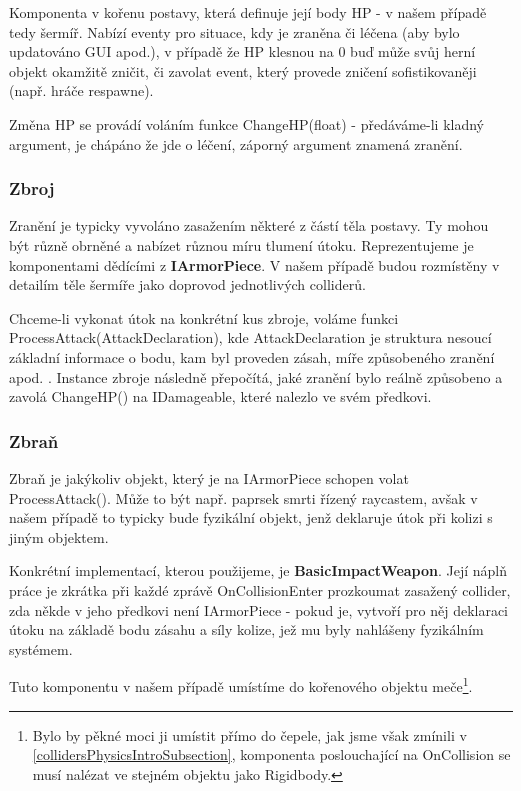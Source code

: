 Komponenta v kořenu postavy, která definuje její body HP - v našem případě tedy šermíř. Nabízí eventy pro situace, kdy je zraněna či léčena (aby bylo updatováno GUI apod.), v případě že HP klesnou na 0 buď může svůj herní objekt okamžitě zničit, či zavolat event, který provede zničení sofistikovaněji (např. hráče respawne). 

Změna HP se provádí voláním funkce ChangeHP(float) - předáváme-li kladný argument, je chápáno že jde o léčení, záporný argument znamená zranění.

\subsubsection*{Zbroj}

Zranění je typicky vyvoláno zasažením některé z částí těla postavy. Ty mohou být různě obrněné a nabízet různou míru tlumení útoku. Reprezentujeme je komponentami dědícími z \textbf{IArmorPiece}. V našem případě budou rozmístěny v detailím těle šermíře jako doprovod jednotlivých colliderů.

Chceme-li vykonat útok na konkrétní kus zbroje, voláme funkci ProcessAttack(AttackDeclaration), kde AttackDeclaration je struktura nesoucí základní informace o bodu, kam byl proveden zásah, míře způsobeného zranění apod. . Instance zbroje následně přepočítá, jaké zranění bylo reálně způsobeno a zavolá ChangeHP() na IDamageable, které nalezlo ve svém předkovi.

\subsubsection*{Zbraň}

Zbraň je jakýkoliv objekt, který je na IArmorPiece schopen volat ProcessAttack(). Může to být např. paprsek smrti řízený raycastem, avšak v našem případě to typicky bude fyzikální objekt, jenž deklaruje útok při kolizi s jiným objektem. 

Konkrétní implementací, kterou použijeme, je \textbf{BasicImpactWeapon}. Její náplň práce je zkrátka při každé zprávě OnCollisionEnter prozkoumat zasažený collider, zda někde v jeho předkovi není IArmorPiece - pokud je, vytvoří pro něj deklaraci útoku na základě bodu zásahu a síly kolize, jež mu byly nahlášeny fyzikálním systémem. 

Tuto komponentu v našem případě umístíme do kořenového objektu meče\footnote{Bylo by pěkné moci ji umístit přímo do čepele, jak jsme však zmínili v \ref{collidersPhysicsIntroSubsection}, komponenta poslouchající na OnCollision se musí nalézat ve stejném objektu jako Rigidbody. }.


